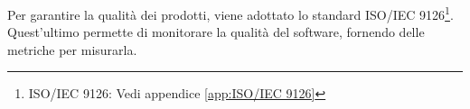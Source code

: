 Per garantire la qualità dei prodotti, viene adottato lo standard ISO/IEC 9126\footnote{ISO/IEC 9126: Vedi appendice \cref{app:ISO/IEC 9126}}. Quest'ultimo permette di monitorare la qualità del software, fornendo delle metriche per misurarla.